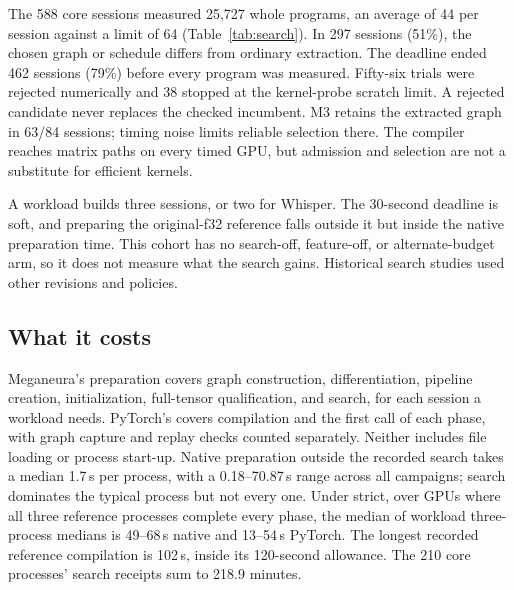 \documentclass[conference]{IEEEtran}
\newcommand{\system}{Meganeura}
\begin{document}
The 588 core sessions measured 25,727 whole programs, an average of 44 per
session against a limit of 64 (Table~\ref{tab:search}). In 297 sessions
(51\%), the chosen graph or schedule differs from ordinary extraction.
The deadline ended 462 sessions (79\%) before every program was measured.
Fifty-six trials were rejected numerically and 38 stopped at the kernel-probe
scratch limit. A rejected candidate never replaces the checked incumbent.
M3 retains the extracted graph in 63/84 sessions; timing noise limits reliable
selection there. The compiler reaches matrix paths on every timed GPU, but
admission and selection are not a substitute for efficient kernels.

A workload builds three sessions, or two for Whisper. The 30-second deadline
is soft, and preparing the original-f32 reference falls outside it but inside
the native preparation time. This cohort has no search-off, feature-off, or
alternate-budget arm, so it does not measure what the search gains.
Historical search studies used other revisions and policies.

\subsection{What it costs}

\begin{table}[t]
\caption{Native preparation by the state of persisted kernel decisions, core
matrix, both contracts. Cold: the process starts without saved decisions;
warm: it loads earlier ones. Driver caches were not controlled.}
\label{tab:preparation}
\centering\footnotesize
\setlength{\tabcolsep}{3pt}

\end{table}

\system{}'s preparation covers graph construction, differentiation,
pipeline creation, initialization, full-tensor qualification, and search,
for each session a workload needs. PyTorch's covers compilation and the
first call of each phase, with graph capture and replay checks counted
separately. Neither includes file loading or process start-up.
Native preparation outside the recorded search takes a median 1.7\,s per
process, with a 0.18--70.87\,s range across all campaigns; search dominates
the typical process but not every one. Under strict, over GPUs where all
three reference processes complete every phase, the median of workload
three-process medians is 49--68\,s native and 13--54\,s PyTorch. The longest
recorded reference compilation is 102\,s, inside its 120-second allowance.
The 210 core processes' search receipts sum to 218.9 minutes.
\end{document}
